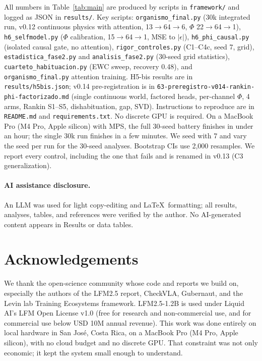 \documentclass[11pt,a4paper]{article}
\begin{document}
All numbers in Table~\ref{tab:main} are produced by scripts in \texttt{framework/} and logged as JSON in \texttt{results/}. Key scripts: \texttt{organismo\_final.py} (30k integrated run, v0.12 continuous physics with attention, 13$\rightarrow$64$\rightarrow$6, $\Phi$ 22$\rightarrow$64$\rightarrow$1), \texttt{h6\_selfmodel.py} ($\Phi$ calibration, 15$\rightarrow$64$\rightarrow$1, MSE to $|\epsilon|$), \texttt{h6\_phi\_causal.py} (isolated causal gate, no attention), \texttt{rigor\_controles.py} (C1--C4c, seed 7, grid), \texttt{estadistica\_fase2.py} and \texttt{analisis\_fase2.py} (30-seed grid statistics), \texttt{cuarteto\_habituacion.py} (EWC sweep, recovery 0.48), and \texttt{organismo\_final.py} attention training. H5-bis results are in \texttt{results/h5bis.json}; v0.14 pre-registration is in \texttt{63-preregistro-v014-rankin-phi-factorizado.md} (single continuous world, factored heads, per-channel $\Phi$, 4 arms, Rankin S1--S5, dishabituation, gap, SVD). Instructions to reproduce are in \texttt{README.md} and \texttt{requirements.txt}. No discrete GPU is required. On a MacBook Pro (M4 Pro, Apple silicon) with MPS, the full 30-seed battery finishes in under an hour; the single 30k run finishes in a few minutes. We seed with 7 and vary the seed per run for the 30-seed analyses. Bootstrap CIs use 2,000 resamples. We report every control, including the one that fails and is renamed in v0.13 (C3 generalization).

\paragraph{AI assistance disclosure.} An LLM was used for light copy-editing and \LaTeX\ formatting; all results, analyses, tables, and references were verified by the author. No AI-generated content appears in Results or data tables.

\section{Acknowledgements}

We thank the open-science community whose code and reports we build on, especially the authors of the LFM2.5 report, CheckVLA, Gubernaut, and the Levin lab Training Ecosystems framework. LFM2.5-1.2B is used under Liquid AI's LFM Open License v1.0 (free for research and non-commercial use, and for commercial use below USD 10M annual revenue). This work was done entirely on local hardware in San Jos\'e, Costa Rica, on a MacBook Pro (M4 Pro, Apple silicon), with no cloud budget and no discrete GPU. That constraint was not only economic; it kept the system small enough to understand.
\end{document}
